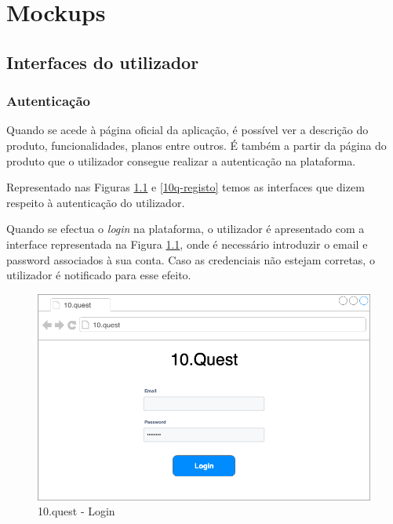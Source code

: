 \chapter{Mockups}
\label{a:prototipos}

\section{Interfaces do utilizador}
\label{interfaces}

\subsection{Autenticação}

Quando se acede à página oficial da aplicação, é possível ver a descrição do produto, funcionalidades, planos entre outros. É também a partir da página do produto que o utilizador consegue realizar a autenticação na plataforma.

Representado nas Figuras \ref{10q-login} e \ref{10q-registo} temos as interfaces que dizem respeito à autenticação do utilizador.

Quando se efectua o \textit{login} na plataforma, o utilizador é apresentado com a interface representada na Figura \ref{10q-login}, onde é necessário introduzir o email e password associados à sua conta. Caso as credenciais não estejam corretas, o utilizador é notificado para esse efeito.



\begin{figure}[ht!]
	\begin{center}
		\includegraphics[width=1\textwidth]{img/prototipos/1.png}
		\caption{10.quest - Login}
		\label{10q-login}
	\end{center}
\end{figure}


